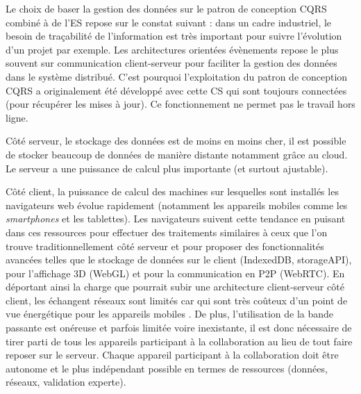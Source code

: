 %

Le choix de baser la gestion des données sur le patron de conception \gls{CQRS} 
combiné à de l'\gls{ES} repose sur le constat suivant : dans un cadre industriel, le 
besoin de traçabilité de l'information est très important pour suivre l'évolution d'un 
projet par exemple. 
Les architectures orientées évènements repose le plus souvent sur 
communication client-serveur pour faciliter la gestion des données dans le 
système distribué. C'est pourquoi l'exploitation du patron de conception 
\gls{CQRS} a originalement été développé avec cette  \gls{CS} qui sont 
toujours connectées (pour récupérer les mises à jour). 
Ce fonctionnement ne permet pas le travail hors ligne.

Côté serveur, le stockage des données est de moins en moins cher, il est possible de stocker beaucoup de données de manière distante notamment 
grâce au \gls{cloud}. Le serveur a une puissance de calcul 
plus importante (et surtout ajustable).

Côté client, la puissance de calcul des machines sur lesquelles sont installés les 
navigateurs web évolue rapidement (notamment les appareils mobiles comme les 
\textit{smartphones} et les tablettes). Les navigateurs suivent cette tendance en 
puisant dans ces ressources pour effectuer des traitements similaires à ceux que 
l'on trouve traditionnellement côté serveur et pour proposer des fonctionnalités 
avancées telles que le stockage de données sur le client (IndexedDB, 
storageAPI), pour l'affichage 3D (WebGL) et pour la communication en \gls{P2P} 
(\gls{WebRTC}). En déportant ainsi la charge que pourrait subir une architecture 
client-serveur côté client, les échangent réseaux sont limités car qui 
sont très coûteux d'un point de vue énergétique pour les appareils mobiles 
\cite{Koskela2015}. De plus, l'utilisation de la bande passante est onéreuse et 
parfois limitée voire inexistante, il est donc nécessaire de tirer parti de tous les 
appareils participant à la collaboration au lieu de tout faire reposer sur le serveur. 
Chaque appareil participant à la collaboration doit être autonome et le plus 
indépendant possible en termes de ressources (données, réseaux, validation 
experte). 

